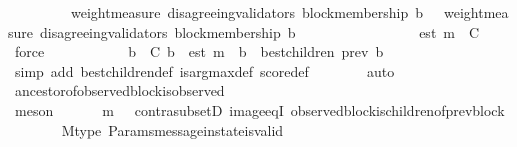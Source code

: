 \begin{isabellebody}
\ \ \ \ \ \ \ \ {\isasymlongrightarrow}\ weight{\isacharunderscore}measure\ {\isacharparenleft}disagreeing{\isacharunderscore}validators\ {\isacharparenleft}block{\isacharunderscore}membership\ b{\isacharcomma}\ {\isasymsigma}{\isacharparenright}{\isacharparenright}\ {\isasymge}\ weight{\isacharunderscore}measure\ {\isacharparenleft}disagreeing{\isacharunderscore}validators\ {\isacharparenleft}block{\isacharunderscore}membership\ b{\isacharprime}{\isacharcomma}\ {\isasymsigma}{\isacharparenright}{\isacharparenright}{\isacartoucheclose}\isanewline
\ \ \ \ \ \ \ \ \ \ {\isacartoucheopen}{\isasymsigma}\ {\isasymin}\ {\isasymSigma}{\isacartoucheclose}\ {\isacartoucheopen}{\isasymsigma}{\isacharprime}\ {\isasymin}\ {\isasymSigma}{\isacartoucheclose}\ {\isacartoucheopen}est\ m\ {\isasymin}\ C{\isacartoucheclose}\ \isamarkupfalse%
\ force\isanewline
\ \ \ \ \isanewline
\ \ \ \ \isamarkupfalse%
\ {\isachardoublequoteopen}{\isasymforall}\ b{\isacharprime}\ {\isasymin}\ C{\isachardot}\ b{\isacharprime}\ {\isasymdownharpoonright}\ est\ m\ {\isasymlongrightarrow}\ b{\isacharprime}\ {\isasymin}\ best{\isacharunderscore}children\ {\isacharparenleft}prev\ b{\isacharprime}{\isacharcomma}\ {\isasymsigma}{\isacharprime}{\isacharparenright}{\isachardoublequoteclose}\isanewline
\ \ \ \ \ \ \isamarkupfalse%
\ {\isacharparenleft}simp\ add{\isacharcolon}\ best{\isacharunderscore}children{\isacharunderscore}def\ is{\isacharunderscore}arg{\isacharunderscore}max{\isacharunderscore}def\ score{\isacharunderscore}def{\isacharparenright}\isanewline
\ \ \ \ \ \ \isamarkupfalse%
\ {\isacharparenleft}auto{\isacharparenright}\ \isanewline
\ \ \ \ \ \ \isamarkupfalse%
\ ancestor{\isacharunderscore}of{\isacharunderscore}observed{\isacharunderscore}block{\isacharunderscore}is{\isacharunderscore}observed\isanewline
\ \ \ \ \ \ \isamarkupfalse%
\ {\isacharparenleft}meson\ {\isacartoucheopen}{\isasymsigma}\ {\isasymsubseteq}\ {\isasymsigma}{\isacharprime}{\isacartoucheclose}\ {\isacartoucheopen}{\isasymsigma}{\isacharprime}\ {\isasymin}\ {\isasymSigma}{\isacartoucheclose}\ {\isacartoucheopen}m\ {\isasymin}\ {\isasymsigma}{\isacartoucheclose}\ contra{\isacharunderscore}subsetD\ image{\isacharunderscore}eqI\ observed{\isacharunderscore}block{\isacharunderscore}is{\isacharunderscore}children{\isacharunderscore}of{\isacharunderscore}prev{\isacharunderscore}block{\isacharparenright}\ \isanewline
\ \ \ \ \ \ \isamarkupfalse%
\ M{\isacharunderscore}type\ Params{\isachardot}message{\isacharunderscore}in{\isacharunderscore}state{\isacharunderscore}is{\isacharunderscore}valid\ {\isacartoucheopen}{\isasymsigma}\ {\isasymin}\ {\isasymSigma}{\isacartoucheclose}\isanewline

\end{isabellebody}
